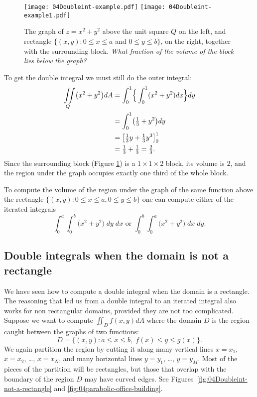\begin{figure}[ht]
  \texttt{[image: 04Doubleint-example.pdf]}
  \texttt{[image: 04Doubleint-example1.pdf]}
  \caption{The graph of $z = x^2 + y^2$ above the unit square $Q$ on the
  left, and rectangle $\{ (x, y) : 0\le x\le a$ and $0\le y\le b\}$,
  on the right, together with the surrounding block.  \textit{What
  fraction of the volume of the block lies below the graph?}}
  \label{fig:04Volume-under-graph-examples}
\end{figure}

To get the double integral we must still do the outer integral:
\begin{align*}
  \iint\limits_Q \bigl( x^2+y^2 \bigr) dA
  &= \int_0^{1} \Bigr\{ \int_0^1 (x^2+y^2)dx \Bigl\}dy  \\
  &= \int_0^{1} \bigl(\tfrac 13 +y^2\bigr) dy \\
  &= \bigl[\tfrac 13 y + \tfrac 13 y^3\bigr]_0^{1} \\
  &= \tfrac 13+ \tfrac 1{3} = \tfrac 23.
\end{align*}
Since the surrounding block (Figure
\ref{fig:04Volume-under-graph-examples}) is a $1\times1\times2$ block,
its volume is $2$, and the region under the graph occupies exactly one
third of the whole block.

To compute the volume of the region under the graph of the same
function above the rectangle $\{(x,y) : 0\leq x\leq a, 0\leq y\leq b\}$
one can compute either of the iterated integrals
\[
\int_0^a\int_0^b \bigl(x^2 + y^2\bigr) \; dy\; dx
\text{ or }
\int_0^b\int_0^a \bigl(x^2 + y^2\bigr) \; dx\; dy.
\]

\subsection{Double integrals when the domain is not a rectangle}
\label{sec:04double-integral-not-over-a-block} 
We have seen how to compute a double integral when the domain is a
rectangle.  The reasoning that led us from a double integral to an
iterated integral also works for non rectangular domains, provided
they are not too complicated.  Suppose we want to compute $\iint_D
f(x, y) dA$ where the domain $D$ is the region caught between the
graphs of two functions:
\[
D = \bigl\{(x, y) : a\leq x\leq b, \; f(x)\le y\le g(x)\bigr\}.
\]
We again partition the region by cutting it along many vertical lines
$x=x_1$, $x=x_2$, \ldots, $x=x_N$, and many horizontal lines $y=y_1$,
\ldots, $y=y_M$.  Most of the pieces of the partition will be
rectangles, but those that overlap with the boundary of the region
$D$ may have curved edges.  See
Figures~\ref{fig:04Doubleint-not-a-rectangle} and
\ref{fig:04parabolic-office-building}.

